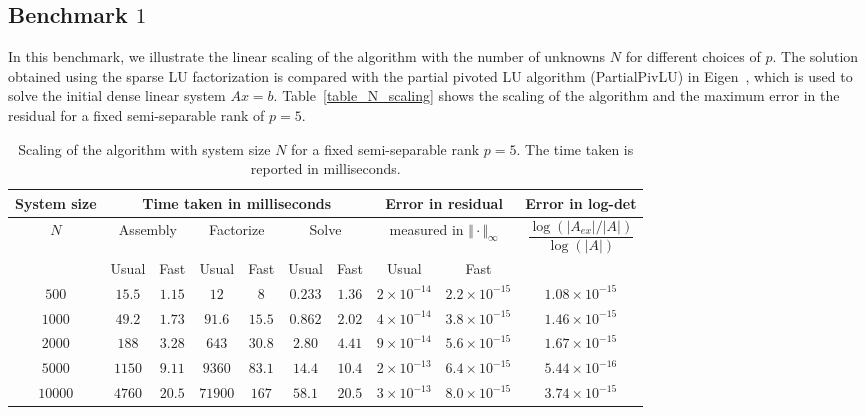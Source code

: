 \documentclass[times]{nlaauth}
\begin{document}
\subsection{Benchmark $1$} 
In this benchmark, we illustrate the linear scaling of the algorithm with the number of unknowns $N$ for different choices of $p$. The solution obtained using the sparse LU factorization is compared with the partial pivoted LU algorithm (PartialPivLU) in Eigen~\cite{eigenweb}, which is used to solve the initial dense linear system $Ax=b$. Table~\ref{table_N_scaling} shows the scaling of the algorithm and the maximum error in the residual for a fixed semi-separable rank of $p=5$.

\begin{table}[!htbp]
\caption{Scaling of the algorithm with system size $N$ for a fixed semi-separable rank $p=5$. The time taken is reported in milliseconds.}
\begin{center}
\begin{tabular}{|c|c|c|c|c|c|c|c|c|c|}
\hline
System size& \multicolumn{6}{c|}{Time taken in milliseconds} & \multicolumn{2}{c|}{Error in residual} & Error in log-det\\
\hline
$N$ & \multicolumn{2}{c|}{Assembly} & \multicolumn{2}{c|}{Factorize} & \multicolumn{2}{c|}{Solve} & \multicolumn{2}{c|}{measured in $\Vert \cdot \Vert_\infty$} & $\dfrac{\log(\vert A_{ex}\vert/\vert A \vert)}{\log(\vert A \vert)}$\\
\hline
 & Usual & Fast & Usual & Fast & Usual & Fast & Usual & Fast & \\
\hline
$500$ & $15.5$ & $1.15$ & $12$ & $8$ & $0.233$ & $1.36$ & $2 \times 10^{-14}$ & $2.2 \times 10^{-15}$ & $1.08 \times 10^{-15}$\\
\hline
$1000$ & $49.2$ & $1.73$ & $91.6$ & $15.5$ & $0.862$ & $2.02$ & $4 \times 10^{-14}$ & $3.8 \times 10^{-15}$ & $1.46 \times 10^{-15}$\\
\hline
$2000$ & $188$ & $3.28$ & $643$ & $30.8$ & $2.80$ & $4.41$ & $9 \times 10^{-14}$ & $5.6 \times 10^{-15}$ & $1.67 \times 10^{-15}$\\
\hline
$5000$ & $1150$ & $9.11$ & $9360$ & $83.1$ & $14.4$ & $10.4$ & $2 \times 10^{-13}$ & $6.4 \times 10^{-15}$ & $5.44 \times 10^{-16}$\\
\hline
$10000$ & $4760$ & $20.5$ & $71900$ & $167$ & $58.1$ & $20.5$ & $3 \times 10^{-13}$ & $8.0 \times 10^{-15}$ & $3.74 \times 10^{-15}$\\

\end{tabular}
\end{center}
\end{table}
\end{document}
